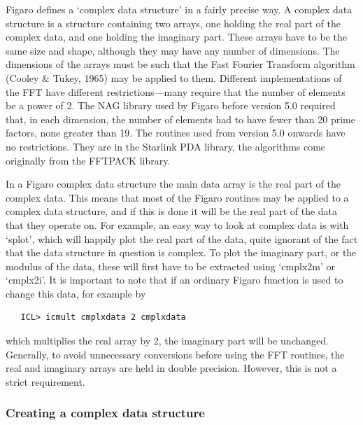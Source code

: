 \documentclass[11pt,twoside]{article}
\newcommand{\latorhtm}[2]{#1}
\newcommand{\latorhtm}[2]{#2}
\begin{document}
   Figaro defines a `complex data structure' in a fairly precise way. A
   complex data structure is a structure containing two arrays, one
   holding the real part of the complex data, and one holding the
   imaginary part. These arrays have to be the same size and shape,
   although they may have any number of dimensions.  The dimensions of
   the arrays must be such that the Fast Fourier Transform algorithm
   (Cooley \& Tukey, 1965) may be applied to them. Different
   implementations of the FFT have different restrictions\latorhtm{---}{-}many
   require
   that the number of elements be a power of 2. The NAG library used by
   Figaro before version 5.0 required that, in each dimension, the number of
   elements had to have fewer than 20 prime factors, none greater than 19.
   The routines used from version 5.0 onwards have no restrictions. They
   are in the Starlink PDA library, the algorithms come originally from
   the FFTPACK library.

   In a Figaro complex data structure the main data array is the real
   part of the complex data. This means that most of the Figaro routines
   may be applied to a complex data structure, and if this is done it
   will be the real part of the data that they operate on.  For example,
   an easy way to look at complex data is with `splot', which will
   happily plot the real part of the data, quite ignorant of the fact
   that the data structure in question is complex.  To plot the
   imaginary part, or the modulus of the data, these will first have to
   be extracted using `cmplx2m' or `cmplx2i'.  It is important to note
   that if an ordinary Figaro function is used to change this data, for
   example by

\begin{verbatim}
   ICL> icmult cmplxdata 2 cmplxdata
\end{verbatim}

   which multiplies the real array by 2, the imaginary part will be
   unchanged. Generally, to avoid unnecessary conversions before using
   the FFT routines, the real and imaginary arrays are held in
   double precision. However, this is not a strict requirement.


\subsubsection{\label{techno6create}Creating a complex data structure}
\end{document}
